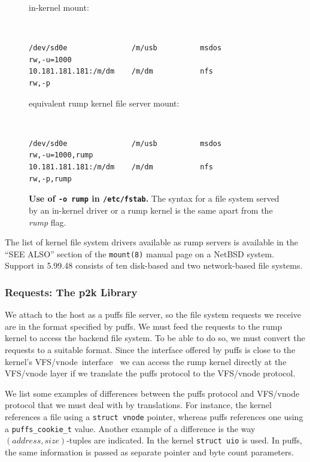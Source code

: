 \begin{figure}[t]
\begin{flushleft}
in-kernel mount:
{\tt \small
\begin{verbatim}
/dev/sd0e               /m/usb          msdos           rw,-u=1000
10.181.181.181:/m/dm    /m/dm           nfs             rw,-p
\end{verbatim}}

equivalent rump kernel file server mount:
{\tt \small
\begin{verbatim}
/dev/sd0e               /m/usb          msdos           rw,-u=1000,rump
10.181.181.181:/m/dm    /m/dm           nfs             rw,-p,rump
\end{verbatim}}
\end{flushleft}
\caption[Use of \texttt{-o rump} in \texttt{/etc/fstab}]{
\textbf{Use of \texttt{-o rump} in \texttt{/etc/fstab}.}
The syntax for a file system served by an in-kernel driver or a rump
kernel is the same apart from the \textit{rump} flag.
}
\label{fig:orump}
\end{figure}

The list of kernel file system drivers available as rump servers
is available in the ``SEE ALSO'' section of the \texttt{mount(8)}
manual page on a NetBSD system.  Support in 5.99.48 consists of ten
disk-based and two network-based file systems.

\subsubsection{Requests: The p2k Library}

We attach to the host as a puffs file server, so the file system
requests we receive are in the format specified by puffs.  We must
feed the requests to the rump kernel to access the backend file
system.  To be able to do so, we must convert the requests to a
suitable format.  Since the interface offered by puffs is close to
the kernel's VFS/vnode~interface~\cite{daemonbook} we can access
the rump kernel directly at the VFS/vnode layer if we translate
the puffs protocol to the VFS/vnode protocol.

We list some examples of differences between the puffs protocol
and VFS/vnode protocol that we must deal with by translations.
For instance, the kernel references a file using a \texttt{struct
vnode} pointer, whereas puffs references one using a
\texttt{puffs\_cookie\_t} value.  Another example of a difference
is the way $(address,size)$-tuples are indicated.  In the kernel
\texttt{struct uio} is used.  In puffs, the same information is
passed as separate pointer and byte count parameters.

